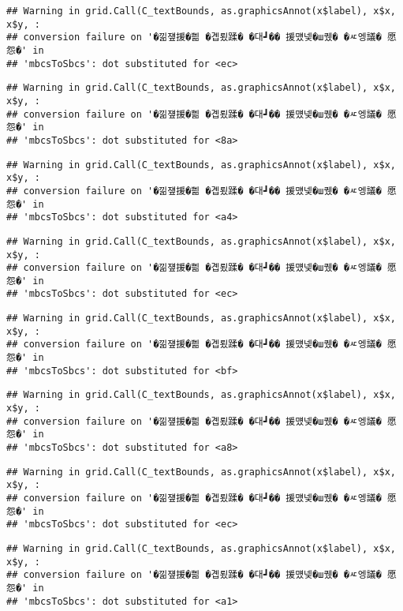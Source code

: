 \documentclass[
]{article}
\begin{document}
\begin{verbatim}
## Warning in grid.Call(C_textBounds, as.graphicsAnnot(x$label), x$x, x$y, :
## conversion failure on '�낆쟾援�쁾 �곕룄蹂� �대┛�� 援먰넻�ш퀬� �ㅼ엥議� 愿怨�' in
## 'mbcsToSbcs': dot substituted for <ec>
\end{verbatim}

\begin{verbatim}
## Warning in grid.Call(C_textBounds, as.graphicsAnnot(x$label), x$x, x$y, :
## conversion failure on '�낆쟾援�쁾 �곕룄蹂� �대┛�� 援먰넻�ш퀬� �ㅼ엥議� 愿怨�' in
## 'mbcsToSbcs': dot substituted for <8a>
\end{verbatim}

\begin{verbatim}
## Warning in grid.Call(C_textBounds, as.graphicsAnnot(x$label), x$x, x$y, :
## conversion failure on '�낆쟾援�쁾 �곕룄蹂� �대┛�� 援먰넻�ш퀬� �ㅼ엥議� 愿怨�' in
## 'mbcsToSbcs': dot substituted for <a4>
\end{verbatim}

\begin{verbatim}
## Warning in grid.Call(C_textBounds, as.graphicsAnnot(x$label), x$x, x$y, :
## conversion failure on '�낆쟾援�쁾 �곕룄蹂� �대┛�� 援먰넻�ш퀬� �ㅼ엥議� 愿怨�' in
## 'mbcsToSbcs': dot substituted for <ec>
\end{verbatim}

\begin{verbatim}
## Warning in grid.Call(C_textBounds, as.graphicsAnnot(x$label), x$x, x$y, :
## conversion failure on '�낆쟾援�쁾 �곕룄蹂� �대┛�� 援먰넻�ш퀬� �ㅼ엥議� 愿怨�' in
## 'mbcsToSbcs': dot substituted for <bf>
\end{verbatim}

\begin{verbatim}
## Warning in grid.Call(C_textBounds, as.graphicsAnnot(x$label), x$x, x$y, :
## conversion failure on '�낆쟾援�쁾 �곕룄蹂� �대┛�� 援먰넻�ш퀬� �ㅼ엥議� 愿怨�' in
## 'mbcsToSbcs': dot substituted for <a8>
\end{verbatim}

\begin{verbatim}
## Warning in grid.Call(C_textBounds, as.graphicsAnnot(x$label), x$x, x$y, :
## conversion failure on '�낆쟾援�쁾 �곕룄蹂� �대┛�� 援먰넻�ш퀬� �ㅼ엥議� 愿怨�' in
## 'mbcsToSbcs': dot substituted for <ec>
\end{verbatim}

\begin{verbatim}
## Warning in grid.Call(C_textBounds, as.graphicsAnnot(x$label), x$x, x$y, :
## conversion failure on '�낆쟾援�쁾 �곕룄蹂� �대┛�� 援먰넻�ш퀬� �ㅼ엥議� 愿怨�' in
## 'mbcsToSbcs': dot substituted for <a1>
\end{verbatim}
\end{document}
